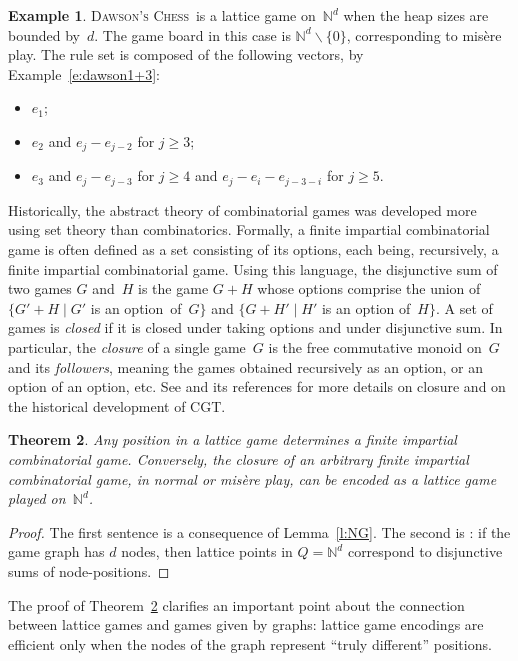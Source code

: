 \documentclass[12pt]{amsart}
\numberwithin{equation}{section}
\newtheorem{thm}{Theorem}[section]
\theoremstyle{definition}
\newtheorem{example}[thm]{Example}
\begin{document}
\begin{example}\label{e:dawsonLattice}
{\textsc{Dawson's Chess}}\ is a lattice game on~${\mathbb{N}}^d$ when the heap sizes are bounded
by~$d$.  The game board in this case is ${\mathbb{N}}^d {\smallsetminus} \{0\}$,
corresponding to mis\`ere play.  The rule set is composed of the
following vectors, by Example~\ref{e:dawson1+3}:
\begin{itemize}
\item$e_1$;
\item$e_2$ and $e_j - e_{j-2}$ for $j \geq 3$;
\item$e_3$ and $e_j - e_{j-3}$ for $j \geq 4$ and $e_j - e_i - e_{j-3-i}$
for $j \geq 5$.
\end{itemize}
\end{example}

Historically, the abstract theory of combinatorial games was developed
more using set theory than combinatorics.  Formally, a finite
impartial combinatorial game is often defined as a set consisting of
its options, each being, recursively, a finite impartial combinatorial
game.  Using this language, the disjunctive sum of two games $G$
and~$H$ is the game $G + H$ whose options comprise the union of $\{G'
+ H \mid G'$ is an option~of~$G\}$ and $\{G + H' \mid H'$ is an option
of~$H\}$.  A set of games is \emph{closed} if it is closed under
taking options and under disjunctive sum.  In particular, the
\emph{closure} of a single game~$G$ is the free commutative monoid
on~$G$ and its \emph{followers}, meaning the games obtained
recursively as an option, or an option of an option, etc.  See
\cite{misereQuots} and its references for more details on closure and
on the historical development of CGT.

\begin{thm}\label{t:arbitrary}
Any position in a lattice game determines a finite impartial
combinatorial game.  Conversely, the closure of an arbitrary finite
impartial combinatorial game, in normal or mis\`ere play, can be
encoded as a lattice game played on~${\mathbb{N}}^d$.
\end{thm}
\begin{proof}
The first sentence is a consequence of Lemma~\ref{l:NG}.  The second
is \cite[Theorem~5.1]{latticeGames}: if the game graph has $d$ nodes,
then lattice points in $Q = {\mathbb{N}}^d$ correspond to disjunctive sums of
node-positions.
\end{proof}

The proof of Theorem~\ref{t:arbitrary} clarifies an important point
about the connection between lattice games and games given by graphs:
lattice game encodings are efficient only when the nodes of the graph
represent ``truly different'' positions.
\end{document}
